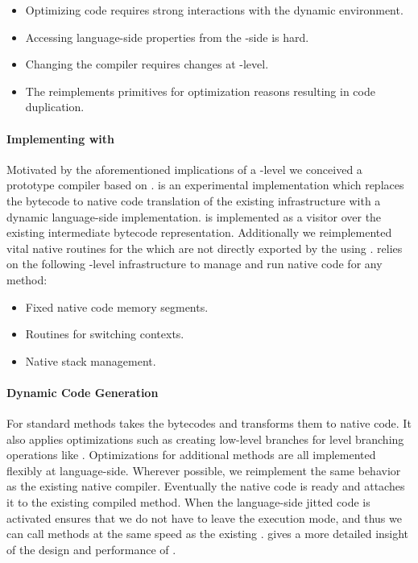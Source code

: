 \begin{itemize}
	\item Optimizing \PH code requires strong interactions with the dynamic environment.
	\item Accessing language-side properties from the \VM-side is hard.
	\item Changing the \JIT compiler requires changes at \VM-level.
	\item The \JIT reimplements primitives for optimization reasons resulting in code duplication.
\end{itemize}

\paragraph{Implementing \NBJ with \B}
Motivated by the aforementioned implications of a \VM-level \JIT we conceived \NB a prototype \JIT compiler based on \B.
\NBJ is an experimental \JIT implementation which replaces the bytecode to native code translation of the existing \JIT infrastructure with a dynamic language-side implementation.
\NBJ is implemented as a visitor over the existing intermediate bytecode representation. 
Additionally we reimplemented vital native routines for the \JIT which are not directly exported by the \VM using \B. 
\NBJ relies on the following \VM-level infrastructure to manage and run native code for any \PH method:

\begin{itemize}[noitemsep]
	\item Fixed native code memory segments.
	\item Routines for switching contexts.
	\item Native stack management.
\end{itemize}

\paragraph{Dynamic Code Generation}
For standard methods \Nabujito takes the bytecodes and transforms them to native code.
It also applies optimizations such as creating low-level branches for \PH level branching operations like .
Optimizations for additional methods are all implemented flexibly at language-side.
Wherever possible, we reimplement the same behavior as the existing native \JIT compiler.
Eventually the native code is ready and \B attaches it to the existing compiled method.
When the language-side jitted code is activated \B ensures that we do not have to leave the \JIT execution mode, and thus we can call methods at the same speed as the existing \JIT.
 gives a more detailed insight of the design and performance of \NBJ.



